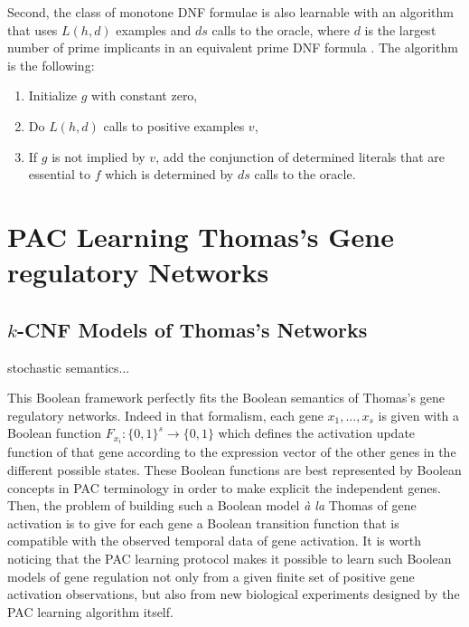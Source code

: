 \documentclass{llncs}
\begin{document}
    Second, the class of monotone DNF formulae is also learnable with an algorithm that uses $L(h,d)$ examples and $ds$ calls to the oracle,
    where $d$ is the largest number of prime implicants in an equivalent prime DNF formula \cite{Valiant84cacm}.
The algorithm is the following:
\begin{enumerate}
\item Initialize $g$ with constant zero,
\item
Do $L(h,d)$ calls to positive examples $v$,
\item
If $g$ is not implied by $v$, add the conjunction of determined literals that are essential to $f$ which is determined by $ds$ calls to the oracle.
\end{enumerate}

\section{PAC Learning Thomas's Gene regulatory Networks}

\subsection{$k$-CNF Models of Thomas's Networks}



stochastic semantics...

  This Boolean framework perfectly fits the Boolean semantics of Thomas's gene regulatory networks.
  Indeed in that formalism, each gene $x_1,\ldots,x_s$ is given with a Boolean function  $F_{x_i}:\{0,1\}^s \rightarrow\{0,1\}$
  which defines the activation update function of that gene
  according to the expression vector of the other genes in the different possible states.
  These Boolean functions are best represented by Boolean concepts in PAC terminology
  in order to make explicit the independent genes.
  Then, the problem of building such a Boolean model \emph{\`a la} Thomas of gene activation is to give for each gene
  a Boolean transition function that is compatible with the observed temporal data of gene activation.
It is worth noticing that the PAC learning protocol makes it possible to learn such Boolean models of gene regulation
not only from a given finite set of positive gene activation observations,
but also from new biological experiments designed by the PAC learning algorithm itself.
\end{document}
